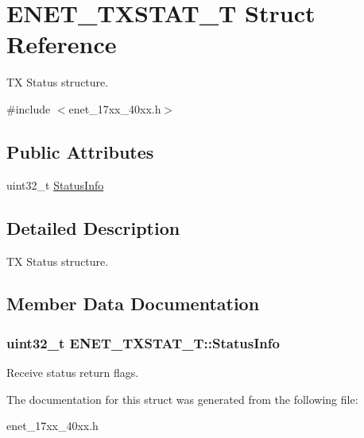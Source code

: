 \hypertarget{struct_e_n_e_t___t_x_s_t_a_t___t}{\section{E\+N\+E\+T\+\_\+\+T\+X\+S\+T\+A\+T\+\_\+\+T Struct Reference}
\label{struct_e_n_e_t___t_x_s_t_a_t___t}
}


T\+X Status structure.  




{\ttfamily \#include $<$enet\+\_\+17xx\+\_\+40xx.\+h$>$}

\subsection*{Public Attributes}
\begin{DoxyCompactItemize}
\item 
uint32\+\_\+t \hyperlink{struct_e_n_e_t___t_x_s_t_a_t___t_a8b19a43922a609a6b5e477c3d5dae72f}{Status\+Info}
\end{DoxyCompactItemize}


\subsection{Detailed Description}
T\+X Status structure. 

\subsection{Member Data Documentation}
\hypertarget{struct_e_n_e_t___t_x_s_t_a_t___t_a8b19a43922a609a6b5e477c3d5dae72f}{
\subsubsection[{Status\+Info}]{\setlength{\rightskip}{0pt plus 5cm}uint32\+\_\+t E\+N\+E\+T\+\_\+\+T\+X\+S\+T\+A\+T\+\_\+\+T\+::\+Status\+Info}}\label{struct_e_n_e_t___t_x_s_t_a_t___t_a8b19a43922a609a6b5e477c3d5dae72f}
Receive status return flags. 

The documentation for this struct was generated from the following file\+:\begin{DoxyCompactItemize}
\item 
enet\+\_\+17xx\+\_\+40xx.\+h\end{DoxyCompactItemize}
